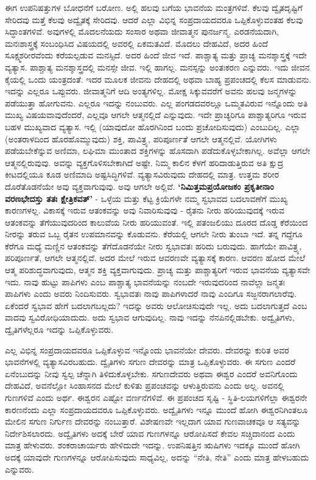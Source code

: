 ಈಗ ಉಪನಿಷತ್ತುಗಳ ಬೋಧನೆಗೆ ಬರೋಣ. ಅಲ್ಲಿ ಹಲವು ಬಗೆಯ ಭಾವನೆಯ ಮಂತ್ರಗಳಿವೆ. ಕೆಲವು ದ್ವೈತದೃಷ್ಟಿಗೆ ಸೇರಿದವು ಮತ್ತೆ ಕೆಲವು ಅದ್ವೈತಕ್ಕೆ ಸೇರಿದವು. ಆದರೆ ಎಲ್ಲಾ ವಿಭಿನ್ನ ಸಂಪ್ರದಾಯದವರೂ ಒಪ್ಪಿಕೊಳ್ಳುವಂತಹ ಕೆಲವು ಸಿದ್ಧಾಂತಗಳಿವೆ. ಅವುಗಳಲ್ಲಿ ಮೊದಲನೆಯದು ಸಂಸಾರ ಅಥವಾ ಜೀವಾತ್ಮನ ಪುನರ್ಜನ್ಮ. ಎರಡನೆಯದಾಗಿ, ಮನಃಶಾಸ್ತ್ರಕ್ಕೆ ಸಂಬಂಧಿಸಿದ ವಿಷಯದಲ್ಲಿ ಅವರಲ್ಲಿ ಏಕಮತವಿದೆ. ಮೊದಲು ದೇಹವಿದೆ, ಅದರ ಹಿಂದೆ ಸೂಕ್ಷ್ಮಶರೀರವೆಂದು ಕರೆಯಲ್ಪಡುವ ಮನಸ್ಸಿದೆ. ಅದರ ಹಿಂದೆ ಜೀವ ಇದೆ. ಪಾಶ್ಚಾತ್ಯ ಮತ್ತು ಪ್ರಾಚ್ಯ ಮನಶ್ಶಾಸ್ತ್ರಕ್ಕೆ ಇದೇ ವ್ಯತ್ಯಾಸ. ಪಾಶ್ಚಾತ್ಯ ಮನಶ್ಶಾಸ್ತ್ರದಲ್ಲಿ ಮನಸ್ಸೇ ಜೀವ. ಇಲ್ಲಿ ಹಾಗಲ್ಲ. ಮನಸ್ಸನ್ನು ಅಂತಃಕರಣ ಎನ್ನುವರು. ಇದು ಜೀವನ ಕೈಯಲ್ಲಿ ಒಂದು ಯಂತ್ರದಂತೆ. ಇದರ ಮೂಲಕ ಜೀವನು ದೇಹದಲ್ಲಿ ಅಥವಾ ಬಾಹ್ಯ ಪ್ರಪಂಚದಲ್ಲಿ ಕೆಲಸ ಮಾಡುವನು. ಇದನ್ನು ಎಲ್ಲರೂ ಒಪ್ಪುವರು. ಜೀವಾತ್ಮನಿಗೆ ಆದಿ ಅಂತ್ಯಗಳಿಲ್ಲ. ಮೋಕ್ಷ ಸಿಕ್ಕುವವರೆಗೆ ಅವನು ಹಲವು ಜನ್ಮಗಳನ್ನು ಪಡೆಯುತ್ತಾ ಹೋಗುವನು. ಎಲ್ಲರೂ ಇದನ್ನು ನಂಬುವರು. ಎಲ್ಲ ಪಂಗಡದವರಲ್ಲೂ ಒಮ್ಮತವಿರುವ ಇನ್ನೊಂದು ಅತಿ ಮುಖ್ಯ ವಿಷಯವಾವುದೆಂದರೆ, ಎಲ್ಲವೂ ಆಗಲೇ ಆತ್ಮನಲ್ಲಿದೆ ಎನ್ನುವುದು. ಇದೇ ಪ್ರಾಚ್ಯರಿಗೂ ಪಾಶ್ಚಾತ್ಯರಿಗೂ ಇರುವ ಬಹಳ ಮುಖ್ಯವಾದ ವ್ಯತ್ಯಾಸ. ಇಲ್ಲಿ  (ಯಾವುದೋ ಹೊರಗಿನಿಂದ ಬಂದು ಪ್ರಚೋದಿಸುವುದು) ಎಂಬುದಿಲ್ಲ. ಎಲ್ಲಾ  (ಅಂತರಾಳದಿಂದ ಹೊರಹೊಮ್ಮುವುದು) ಶಕ್ತಿ, ಪಾವಿತ್ರ್ಯ, ಪರಿಪೂರ್ಣತೆ ಆಗಲೇ ಆತ್ಮನಲ್ಲಿವೆ. ಯೋಗಿಗಳು ಪಡೆಯಬೇಕೆನ್ನುವ ಅಣಿಮಾ, ಲಘಿಮಾ ಮುಂತಾದ ಶಕ್ತಿಗಳನ್ನು ಹೊಸದಾಗಿ ಪಡೆದುಕೊಳ್ಳಬೇಕಾಗಿಲ್ಲ. ಅವೆಲ್ಲಾ ಆಗಲೇ ಆತ್ಮನಲ್ಲಿರುವುವು. ಅವನ್ನು ವ್ಯಕ್ತಗೊಳಿಸಬೇಕಾಗಿದೆ ಅಷ್ಟೇ. ನಿಮ್ಮ ಕಾಲಿನ ಕೆಳಗೆ ಹರಿದಾಡುತ್ತಿರುವ ಅತಿ ಕ್ಷುದ್ರ ಕೀಟದಲ್ಲಿಯೂ ಕೂಡ ಅಣಿಮಾದಿ ಅಷ್ಟಸಿದ್ಧಿಗಳಿವೆ. ವ್ಯತ್ಯಾಸವಿರುವುದು ದೇಹದಲ್ಲಿ ಮಾತ್ರ. ಉತ್ತಮ ಶರೀರ ದೊರೆತೊಡನೆಯೇ ಅವು ವ್ಯಕ್ತವಾಗುವುವು. ಅವು ಆಗಲೇ ಅಲ್ಲಿವೆ. \textbf{‘ನಿಮಿತ್ತಮಪ್ರಯೋಜಕಂ ಪ್ರಕೃತೀನಾಂ ವರಣಭೇದಸ್ತು ತತಃ ಕ್ಷೇತ್ರಿಕವತ್​’} - ಒಳ್ಳೆಯ ಮತ್ತು ಕೆಟ್ಟ ಕ್ರಿಯೆಗಳೇ ನಮ್ಮ ಸ್ವಭಾವದ ಬದಲಾವಣೆಗೆ ಮುಖ್ಯ ಕಾರಣಗಳಲ್ಲ. ವಿಕಾಸಕ್ಕೆ ಇರುವ ಆತಂಕವನ್ನು ಅವು ನಿವಾರಿಸುವುವು - ರೈತನು ನೀರು ಹರಿಯುವುದಕ್ಕೆ ಇರುವ ಆತಂಕವನ್ನು ತೆಗೆಯುವುದರಿಂದ ಕಾಲುವೆಯ ನೀರು ಹರಿಯುವಂತೆ. ಇಲ್ಲಿ ಪತಂಜಲಿಯು ದೂರದ ದೊಡ್ಡ ಕೆರೆಯಿಂದ ನೀರನ್ನು ತರುವ ಒಬ್ಬ ರೈತನ ಉಪಮಾನವನ್ನು ಕೊಡುವನು. ಕೆರೆಯಲ್ಲಿ ಆಗಲೇ ನೀರು ತುಂಬಾ ಇದೆ. ತನ್ನ ಗದ್ದೆಗೂ ಕೆರೆಗೂ ಮಧ್ಯೆ ಮಣ್ಣಿನ ಆತಂಕವನ್ನು ತೆಗೆದೊಡನೆಯೇ ನೀರು ಸ್ವಭಾವತಃ ಹರಿದು ಬರುವುದು. ಹಾಗೆಯೇ ಪಾವಿತ್ರ್ಯ, ಪರಿಪೂರ್ಣತೆ, ಆಗಲೇ ಆತ್ಮನಲ್ಲಿವೆ. ಅದರ ಮೇಲೆ ಇರುವ ಆವರಣವೇ ವ್ಯತ್ಯಾಸಕ್ಕೆ ಕಾರಣ. ಆವರಣ ಹೋದ ಮೇಲೆ ಆತ್ಮ ಪರಿಶುದ್ಧವಾಗುವುದು, ಆತ್ಮನ ಶಕ್ತಿ ವ್ಯಕ್ತವಾಗುವುದು. ಪ್ರಾಚ್ಯ ಮತ್ತು ಪಾಶ್ಚಾತ್ಯರಿಗೆ ಇರುವ ಭಾವನೆಯ ವ್ಯತ್ಯಾಸವೇ ಇದು. ನಾವು ಹುಟ್ಟು ಪಾಪಿಗಳು ಎಂಬ ಪಾಶ್ಚಾತ್ಯ ಭಾವನೆಯನ್ನು ನಂಬದೇ ಇರುವುದರಿಂದ ನಾವೆಲ್ಲಾ ಜನ್ಮತಃ ಪಾಪಿಗಳು ಎಂದು ಅವರು ನಿಂದಿಸುವರು. ಸ್ವಭಾವತಃ ನಾವು ಪಾಪಿಗಳಾದರೆ ನಾವು ಎಂದಿಗೂ ಸಜ್ಜನರಾಗಲಾರೆವು. ಏಕೆಂದರೆ ಸ್ವಭಾವ ಹೇಗೆ ಬದಲಾಗಬಲ್ಲದು? ಇದನ್ನು ಅವರು ಆಲೋಚಿಸುವುದೇ ಇಲ್ಲ. ಅದು ಬದಲಾಗುತ್ತದೆ ಎಂಬ ವಾದವು ಸ್ವವಿರೋಧಿಯಾದುದು. ಅದು ಸ್ವಭಾವ ಆಗುವುದಿಲ್ಲ. ನಾವು ಇದನ್ನು ನೆನಪಿನಲ್ಲಿಡಬೇಕು. ಅದ್ವೈತಿಗಳು, ದ್ವೈತಿಗಳೆಲ್ಲರೂ ಇದನ್ನು ಒಪ್ಪಿಕೊಳ್ಳುವರು.

ಎಲ್ಲ ವಿಭಿನ್ನ ಸಂಪ್ರದಾಯದವರೂ ಒಪ್ಪಿಕೊಳ್ಳುವ ಇನ್ನೊಂದು ಭಾವನೆಯೇ ದೇವರು. ದೇವರನ್ನು ಕುರಿತ ಅವರ ಭಾವನೆಗಳಲ್ಲಿ ವ್ಯತ್ಯಾಸವಿರಬಹುದು. ದ್ವೈತಿಗಳು ಸಗುಣ ದೇವರನ್ನು ಮಾತ್ರ ಒಪ್ಪಿಕೊಳ್ಳುವರು. ಈ ಸಗುಣ ಎಂದರೆ ಏನೆಂಬುದನ್ನು ನೀವು ಸ್ವಲ್ಪ ಚೆನ್ನಾಗಿ ತಿಳಿದುಕೊಳ್ಳಬೇಕು. ಸಗುಣದೇವರು ಅಥವಾ ಈಶ್ವರ ಎಂದರೆ ಅವನಿಗೊಂದು ದೇಹವಿದೆ, ಅವನೆಲ್ಲೋ ಸಿಂಹಾಸನದ ಮೇಲೆ ಕುಳಿತು ಪ್ರಪಂಚವನ್ನು ಆಳುತ್ತಿರುವನು ಎಂದು ಅಲ್ಲ. ಅವನಲ್ಲಿ ಗುಣಗಳಿವೆ ಎಂದು ಅರ್ಥ. ಈಶ್ವರನ ಎಷ್ಟೋ ವರ್ಣನೆಗಳಿವೆ. ಈ ಪ್ರಪಂಚದ ಸೃಷ್ಟಿ - ಸ್ಥಿತಿ-ಲಯಗಳಿಗೆಲ್ಲಾ ಈಶ್ವರನೇ ಕಾರಣನೆಂದು ಎಲ್ಲಾ ಸಂಪ್ರದಾಯದವರೂ ಒಪ್ಪಿಕೊಳ್ಳುವರು. ಅದ್ವೈತಿಗಳು ಇನ್ನೂ ಮುಂದೆ ಹೋಗಿ ಈಶ್ವರನಿಗಿಂತಲೂ ಮೇಲಿನ ಸಗುಣ ನಿರ್ಗುಣ ದೇವರನ್ನು ನಂಬುತ್ತಾರೆ. ವಿಶೇಷಣವೇ ಇಲ್ಲದಾಗ ಯಾವ ಗುಣವಾಚಕವೂ ಆ ಸತ್ಯವನ್ನು ನಿರ್ದೇಶಿಸಲಾರದು. ಅದ್ವೈತಿಗಳು ಅದಕ್ಕೆ ಬೇರೆ ಯಾವ ಗುಣಗಳನ್ನೂ ಆರೋಪಿಸದೆ ಕೇವಲ ಸಚ್ಚಿದಾನಂದ ಎಂದು ಮಾತ್ರ ಹೇಳುವರು. ಶಂಕರಾಚಾರ್ಯರು ಹೇಳಿದುದೇ ಇದನ್ನು. ಉಪನಿಷತ್ತಿನ ಋಷಿಗಳು ಇದಕ್ಕೂ ಮುಂದೆ ಹೋಗಿ ಅದಕ್ಕೆ ಯಾವುದೇ ಗುಣಗಳನ್ನೂ ಆರೋಪಿಸುವುದು ಸಾಧ್ಯವಿಲ್ಲ, ಅದನ್ನು “ನೇತಿ, ನೇತಿ” ಎಂದು ಮಾತ್ರ ಹೇಳಬಹುದು ಎನ್ನುವರು.

